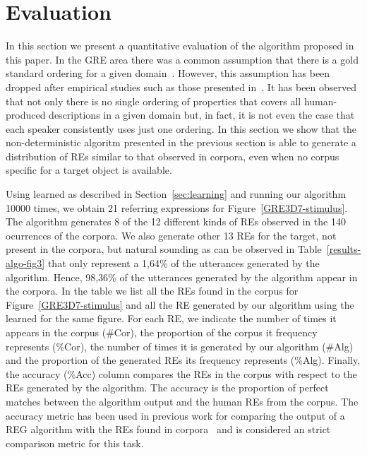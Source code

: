 \section{Evaluation}
\label{sec:evaluation}

In this section we present a quantitative evaluation of the algorithm proposed in this paper. In the GRE area there was a common assumption that there is a gold standard ordering for a given domain~\cite{Dale1995}. However, this assumption has been dropped after empirical studies such as those presented in~\cite{arec2:2008:Areces,viet:gene11}. It has been observed that not only there is no single ordering of properties that covers all human-produced descriptions in a given domain but, in fact, it is not even the case that each speaker consistently uses just one ordering. In this section we show that the non-deterministic algoritm presented in the previous section is able to generate a distribution of REs similar to that observed in corpora, even when no corpus specific for a target object is available. 

Using \puse learned as described in Section~\ref{sec:learning} and running our algorithm 10000 times, we obtain 21 referring expressions for Figure~\ref{GRE3D7-stimulus}. The algorithm generates 8 of the 12 different kinds of REs observed in the 140 ocurrences of the corpora. We also generate other 13 REs for the target, not present in the corpora, but natural sounding as can be observed in Table~\ref{results-algo-fig3} that only represent a 1,64\% of the utterances generated by the algorithm. Hence, 98,36\% of the utterances generated by the algorithm appear in the corpora. In the table we list all the REs found in the corpus for Figure~\ref{GRE3D7-stimulus} and all the RE generated by our algorithm using the learned \puse for the same figure. For each RE, we indicate the number of times it appears in the corpus (\#Cor), the proportion of the corpus it frequency represents (\%Cor), the number of times it is generated by our algorithm (\#Alg) and the proportion of the generated REs its frequency represents (\%Alg). Finally, the accuracy (\%Acc) column compares the REs in the corpus with respect to the REs generated by the algorithm. The accuracy is the proportion of perfect matches between the algorithm output and the human REs from the corpus. The accuracy metric has been used in previous work for comparing the output of a REG algorithm with the REs found in corpora~\cite{sluis07:eval,viet:gene11} and is considered an strict comparison metric for this task. 

